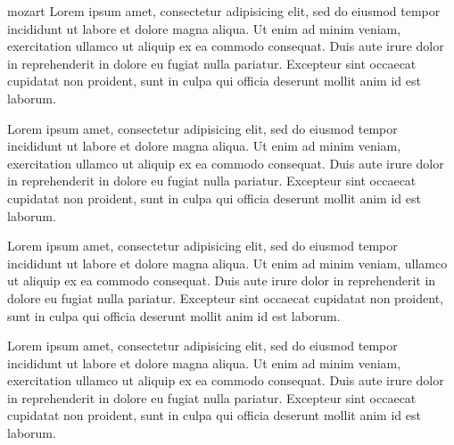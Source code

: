 \documentclass{article}
\begin{document}
\begin{grafikumlauf}{mozart}
Lorem ipsum  amet, consectetur adipisicing elit, sed
do eiusmod tempor incididunt ut labore et dolore magna aliqua. Ut enim
ad minim veniam,  exercitation ullamco
 ut aliquip ex ea commodo consequat. Duis aute
irure dolor in reprehenderit in 
dolore eu fugiat nulla pariatur. Excepteur sint occaecat cupidatat non
proident, sunt in culpa qui officia deserunt mollit anim id est laborum.

Lorem ipsum  amet, consectetur adipisicing elit, sed
do eiusmod tempor incididunt ut labore et dolore magna aliqua. Ut enim
ad minim veniam,  exercitation ullamco
 ut aliquip ex ea commodo consequat. Duis aute
irure dolor in reprehenderit in 
dolore eu fugiat nulla pariatur. Excepteur sint occaecat cupidatat non
proident, sunt in culpa qui officia deserunt mollit anim id est laborum.
\end{grafikumlauf}

Lorem ipsum  amet, consectetur adipisicing elit, sed
do eiusmod tempor incididunt ut labore et dolore magna aliqua. Ut enim
ad minim veniam, ullamco  ut aliquip
ex ea commodo consequat. Duis aute irure dolor in reprehenderit in
 dolore eu fugiat nulla pariatur.
Excepteur sint occaecat cupidatat non proident, sunt in culpa qui
officia deserunt mollit anim id est laborum.

Lorem ipsum  amet, consectetur adipisicing elit, sed
do eiusmod tempor incididunt ut labore et dolore magna aliqua. Ut enim
ad minim veniam, exercitation ullamco
 ut aliquip ex ea commodo consequat. Duis aute
irure dolor in reprehenderit in 
dolore eu fugiat nulla pariatur. Excepteur sint occaecat cupidatat non
proident, sunt in culpa qui officia deserunt mollit anim id est laborum.
\end{document}
